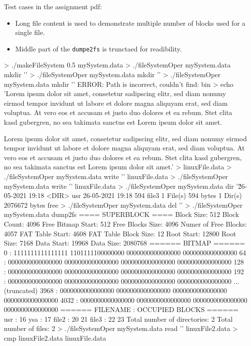 \documentclass[a4paper]{article}
\begin{document}
\newpage

Test cases in the assignment pdf:

\begin{itemize}
\item Long file content is used to demonstrate multiple number of blocks used for a single file.
\item Middle part of the \texttt{dumpe2fs} is trunctaed for readibility.
\end{itemize}


\begin{textcode} 
> ./makeFileSystem 0.5 mySystem.data
> ./fileSystemOper mySystem.data mkdir '\usr'
> ./fileSystemOper mySystem.data mkdir '\usr\ysa'
> ./fileSystemOper mySystem.data mkdir '\bin\ysa'
ERROR: Path is incorrect, couldn't find: bin
> echo 'Lorem ipsum dolor sit amet, consetetur sadipscing elitr, sed diam nonumy eirmod tempor invidunt ut labore et dolore magna aliquyam erat, sed diam voluptua. At vero eos et accusam et justo duo dolores et ea rebum. Stet clita kasd gubergren, no sea takimata sanctus est Lorem ipsum dolor sit amet.

Lorem ipsum dolor sit amet, consetetur sadipscing elitr, sed diam nonumy eirmod tempor invidunt ut labore et dolore magna aliquyam erat, sed diam voluptua. At vero eos et accusam et justo duo dolores et ea rebum. Stet clita kasd gubergren, no sea takimata sanctus est Lorem ipsum dolor sit amet.' > linuxFile.data
> ./fileSystemOper mySystem.data write '\usr{}' linuxFile.data
> ./fileSystemOper mySystem.data write '' linuxFile.data
> ./fileSystemOper mySystem.data dir '\'
26-05-2021  19:18  <DIR>         usr
26-05-2021  19:18           594  file3
         1 File(s)        594 bytes
         1 Dir(s)    2076672 bytes free
> ./fileSystemOper mySystem.data del '\usr\ysa{}'
> ./fileSystemOper mySystem.data dump2fs
==== SUPERBLOCK ====
Block Size:            512
Block Count:           4096
Free Bitmap Start:     512
Free Blocks Size:      4096
Numer of Free Blocks:  4057
FAT Table Start:       4608
FAT Table Block Size:  12
Root Start:            12800
Root Size:             7168
Data Start:            19968
Data Size:             2080768
====== BITMAP ======
    0 : 1111111111111111 1101111100000000 0000000000000000 0000000000000000
   64 : 0000000000000000 0000000000000000 0000000000000000 0000000000000000
  128 : 0000000000000000 0000000000000000 0000000000000000 0000000000000000
  192 : 0000000000000000 0000000000000000 0000000000000000 0000000000000000
...(truncated)
 3968 : 0000000000000000 0000000000000000 0000000000000000 0000000000000000
 4032 : 0000000000000000 0000000000000000 0000000000000000 0000000000000000
====== FILENAME : OCCUPIED BLOCKS ======
usr             : 16 
ysa             : 17 
file2           : 20 21 
file3           : 22 23 
Total number of directories: 2
Total number of files: 2
> ./fileSystemOper mySystem.data read '\usr{}' linuxFile2.data
> cmp linuxFile2.data linuxFile.data
\end{textcode} 
\end{document}
